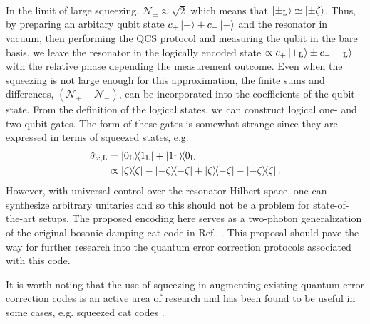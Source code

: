 {\begin{align}
\end{align}
In the limit of large squeezing, $\mathcal{N}_{\pm}\approx \sqrt{2}$ which means that $\ket{\pm_{\text{L}}}\simeq\ket{\pm\zeta}$. Thus, by preparing an arbitary qubit state $c_{+}\ket{+}+c_{-}\ket{-}$ and the resonator in vacuum, then performing the QCS protocol and measuring the qubit in the bare basis, we leave the resonator in the logically encoded state $\propto c_+\ket{+_{\text{L}}}\pm c_-\ket{-_{\text{L}}}$ with the relative phase depending the measurement outcome. Even when the squeezing is not large enough for this approximation, the finite sums and differences, $(\mathcal{N}_+ \pm \mathcal{N}_-)$, can be incorporated into the coefficients of the qubit state. From the definition of the logical states, we can construct logical one- and two-qubit gates. The form of these gates is somewhat strange since they are expressed in terms of squeezed states, e.g. \begin{align*}\hat{\sigma}_{x,\text{L}}&=\dyad{0_{\text{L}}}{1_{\text{L}}}+\dyad{1_{\text{L}}}{0_{\text{L}}}\nonumber\\ &\propto \dyad{\zeta}{\zeta}-\dyad{-\zeta}{-\zeta}+\dyad{\zeta}{-\zeta}-\dyad{-\zeta}{\zeta}.\end{align*} However, with universal control over the resonator Hilbert space, one can synthesize arbitrary unitaries and so this should not be a problem for state-of-the-art setups. The proposed encoding here serves as a two-photon generalization of the original bosonic damping cat code in Ref.~\cite{CochraneCatCode}. This {proposal} should pave the way for further research into the quantum error correction protocols associated with this code. }

{It is worth noting that the use of squeezing in augmenting existing quantum error correction codes is an active area of research and has been found to be useful in some cases, e.g. squeezed cat codes \cite{SqueezedCats}.}





